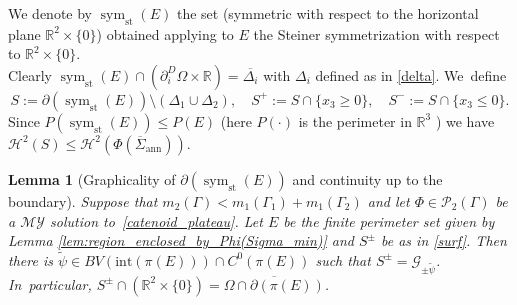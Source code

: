 \documentclass[JEP,XML,SOM,Unicode, NoFloatCountersInSection,published]{cedram}
\DeclareMathOperator{\sym}{sym}
\newcommand{\R}{\mathbb{R}}
\let\Om\Omega
\newcommand{\immclosedann}{\Phi({\overline\Sigma}_\mathrm{ann})}
\newtheorem{lemma}[theorem]{Lemma}
\theoremstyle{definition}
\begin{document}
We denote by $\sym_\mathrm{st}(E)$ the set (symmetric with respect to the horizontal plane $\R^2\times\{0\}$) obtained applying to $E$ the Steiner symmetrization with respect to $\R^2\times\{0\}$. \\
Clearly $\sym_\mathrm{st}(E)\cap(\partial_i^D\Om\times\R)=\overline{\Delta_i}$ with $\Delta_i$ defined as in \eqref{delta}. We~define
\begin{equation}\label{surf}
S:= \partial(\sym_\mathrm{st} (E))\setminus(\Delta_1\cup\Delta_2),\quad
S^+:= S\cap\{x_3\ge0\},\quad S^-:= S\cap\{x_3\le0\}.
\end{equation}
Since $P(\sym_\mathrm{st}(E))\le P(E)$ (here $P(\cdot)$ is the perimeter in $\R^3$ \cite{AFP}) we have $\mathcal{H}^2(S)\le\mathcal{H}^2(
\immclosedann)$.

\begin{lemma}[Graphicality
of $\partial(\sym_\mathrm{st} (E))$ and continuity up to the boundary]
\label{lem:graphicality_of_boundary_and_continuity_up_to_the_boundary}
Suppose that $m_2(\Gamma)<m_1(\Gamma_1)+m_1(\Gamma_2)$ and let $\Phi\in\mathcal{P}_2(\Gamma)$ be a $\mathcal{MY}$ solution to~\eqref{catenoid_plateau}.
Let $E$ be the finite perimeter set given by Lemma \ref{lem:region_enclosed_by_Phi(Sigma_min)} and $S^\pm$ be as in \eqref{surf}.
Then there is $\widetilde \psi\in BV(\mathrm{int}(\pi(E)))\cap C^0(\pi(E))$ such that
$
S^\pm=
\mathcal {G}_{\pm\widetilde\psi}$.
In~particular, $S^\pm\cap(\R^2\times\{0\})=\overline{\Om\cap\partial(\pi(E))}$.
\end{lemma}
\end{document}
